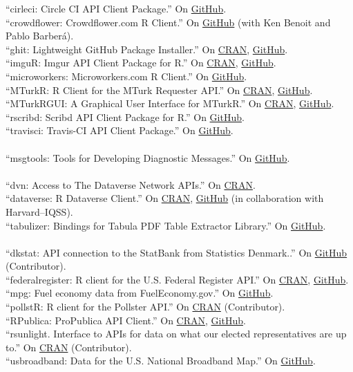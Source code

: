 \documentclass[12pt]{article}
\newcommand{\topic}[1]{\pagebreak[3]\indent {\color{lg}{\footnotesize #1 }}\\}
\newcommand{\entry}[1]{\indent {\color{lg}\guillemotright}\hspace{2pt}#1\vspace{.25em}\\}
\begin{document}
	\entry{``cirleci: Circle CI API Client Package.'' On \href{https://github.com/cloudyr/circleci}{GitHub}.}
	\entry{``crowdflower: Crowdflower.com R Client.'' On \href{https://github.com/cloudyr/crowdflower}{GitHub} (with Ken Benoit and Pablo Barber\'{a}).}
	\entry{``ghit: Lightweight GitHub Package Installer.'' On \href{https://cran.r-project.org/package=ghit}{CRAN}, \href{https://github.com/cloudyr/ghit}{GitHub}.}
	\entry{``imguR: Imgur API Client Package for R.'' On \href{https://cran.r-project.org/package=imguR}{CRAN}, \href{https://github.com/cloudyr/imguR}{GitHub}.}
	\entry{``microworkers: Microworkers.com R Client.'' On \href{https://github.com/cloudyr/microworkers}{GitHub}.}
	\entry{``MTurkR: R Client for the MTurk Requester API.'' On \href{https://cran.r-project.org/package=MTurkR}{CRAN}, \href{https://github.com/leeper/MTurkR}{GitHub}.}
	\entry{``MTurkRGUI: A Graphical User Interface for MTurkR.'' On \href{https://cran.r-project.org/package=MTurkRGUI}{CRAN}, \href{https://github.com/leeper/MTurkRGUI}{GitHub}.}
	\entry{``rscribd: Scribd API Client Package for R.'' On \href{https://github.com/cloudyr/rscribd}{GitHub}.}
	\entry{``travisci: Travis-CI API Client Package.'' On \href{https://github.com/cloudyr/travisci}{GitHub}.}

	\topic{R packages contributed to RL10N}
	\entry{``msgtools: Tools for Developing Diagnostic Messages.'' On \href{https://github.com/RL10N/msgtools}{GitHub}.}

	\topic{R packages contributed to the rOpenSci project}
	\entry{``dvn: Access to The Dataverse Network APIs.'' On \href{https://cran.r-project.org/package=dvn}{CRAN}.}
	\entry{``dataverse: R Dataverse Client.'' On \href{https://cran.r-project.org/package=dataverse}{CRAN}, \href{https://github.com/iqss/dataverse-client-r}{GitHub} (in collaboration with Harvard--IQSS).}
	\entry{``tabulizer: Bindings for Tabula PDF Table Extractor Library.'' On \href{https://github.com/ropensci/tabulizer}{GitHub}.}

	\topic{R packages contributed to the rOpenGov project}
	\entry{``dkstat: API connection to the StatBank from Statistics Denmark..'' On \href{https://github.com/rOpenGov/dkstat}{GitHub} (Contributor).}
	\entry{``federalregister: R client for the U.S. Federal Register API.'' On \href{https://cran.r-project.org/package=federalregister}{CRAN}, \href{https://github.com/rOpenGov/federalregister}{GitHub}.}
	\entry{``mpg: Fuel economy data from FuelEconomy.gov.'' On \href{https://github.com/rOpenGov/mpg}{GitHub}.}
	\entry{``pollstR: R client for the Pollster API.'' On \href{https://cran.r-project.org/package=pollstR}{CRAN} (Contributor).}
	\entry{``RPublica: ProPublica API Client.'' On \href{https://cran.r-project.org/package=RPublica}{CRAN}, \href{https://github.com/rOpenGov/RPublica}{GitHub}.}
	\entry{``rsunlight. Interface to APIs for data on what our elected representatives are up to.'' On \href{https://cran.r-project.org/package=rsunlight}{CRAN} (Contributor).}
	\entry{``usbroadband: Data for the U.S. National Broadband Map.'' On \href{https://github.com/rOpenGov/usbroadband}{GitHub}.}
\end{document}
